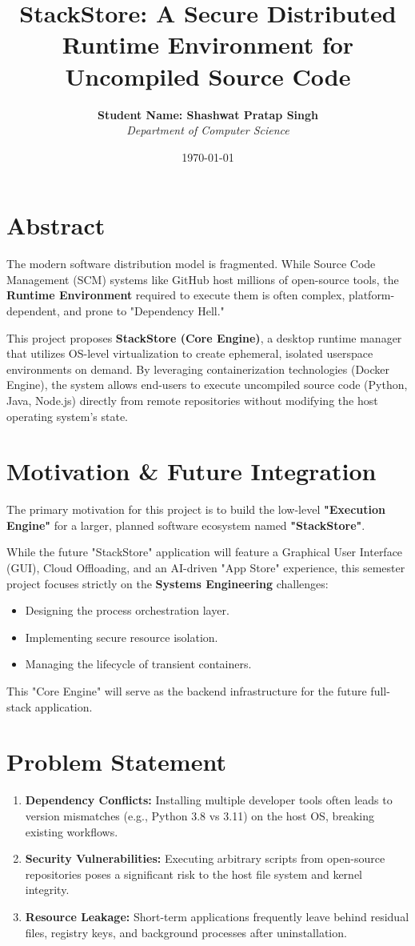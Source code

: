 \documentclass[11pt, a4paper]{article}
\title{\textbf{StackStore: A Secure Distributed Runtime Environment for Uncompiled Source Code}}
\author{\textbf{Student Name: Shashwat Pratap Singh} \\ \textit{Department of Computer Science}}
\date{\today}
\begin{document}
\maketitle

\section{Abstract}
The modern software distribution model is fragmented. While Source Code Management (SCM) systems like GitHub host millions of open-source tools, the \textbf{Runtime Environment} required to execute them is often complex, platform-dependent, and prone to "Dependency Hell."

This project proposes \textbf{StackStore (Core Engine)}, a desktop runtime manager that utilizes OS-level virtualization to create ephemeral, isolated userspace environments on demand. By leveraging containerization technologies (Docker Engine), the system allows end-users to execute uncompiled source code (Python, Java, Node.js) directly from remote repositories without modifying the host operating system’s state.

\section{Motivation \& Future Integration}
The primary motivation for this project is to build the low-level \textbf{"Execution Engine"} for a larger, planned software ecosystem named \textbf{"StackStore"}.

While the future "StackStore" application will feature a Graphical User Interface (GUI), Cloud Offloading, and an AI-driven "App Store" experience, this semester project focuses strictly on the \textbf{Systems Engineering} challenges:
\begin{itemize}
    \item Designing the process orchestration layer.
    \item Implementing secure resource isolation.
    \item Managing the lifecycle of transient containers.
\end{itemize}
This "Core Engine" will serve as the backend infrastructure for the future full-stack application.

\section{Problem Statement}
\begin{enumerate}
    \item \textbf{Dependency Conflicts:} Installing multiple developer tools often leads to version mismatches (e.g., Python 3.8 vs 3.11) on the host OS, breaking existing workflows.
    \item \textbf{Security Vulnerabilities:} Executing arbitrary scripts from open-source repositories poses a significant risk to the host file system and kernel integrity.
    \item \textbf{Resource Leakage:} Short-term applications frequently leave behind residual files, registry keys, and background processes after uninstallation.
\end{enumerate}
\end{document}
